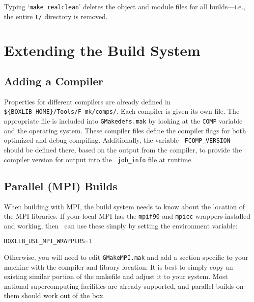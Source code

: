 Typing `{\tt make realclean}' deletes the object and module files for
all builds---i.e., the entire {\tt t/} directory is removed.

\section{Extending the Build System}

\subsection{Adding a Compiler}

Properties for different compilers are already defined in 
{\tt \$\{BOXLIB\_HOME\}/Tools/F\_mk/comps/}.
Each compiler is given its own file.  The appropriate file is included
into {\tt GMakedefs.mak} by looking at the {\tt COMP} variable and the
operating system.  These compiler files define the compiler flags for
both optimized and debug compiling.  Additionally, the variable {\tt
FCOMP\_VERSION} should be defined there, based on the output from the
compiler, to provide the compiler version for output into the {\tt
job\_info} file at runtime.


\subsection{Parallel (MPI) Builds}

When building with MPI, the build system needs to know about the location of the
MPI libraries.  If your local MPI has the {\tt mpif90} and {\tt mpicc} wrappers
installed and working, then \maestro\ can use these simply by setting the
environment variable:
\begin{verbatim}
BOXLIB_USE_MPI_WRAPPERS=1
\end{verbatim}
Otherwise, you will need to edit {\tt GMakeMPI.mak} and add a section
specific to your machine with the compiler and library location.  It
is best to simply copy an existing similar portion of the makefile and
adjust it to your system.  Most national supercomputing facilities are
already supported, and parallel builds on them should work out of the
box.



